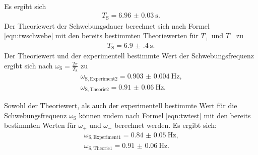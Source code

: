 \\Es ergibt sich
\begin{align*}
	T_{\mathrm{S}}=\SI{6.96(3)}{\second}\text{.}
\end{align*}
Der Theoriewert der Schwebungsdauer berechnet sich nach Formel \eqref{eqn:twschwebe} mit den bereits bestimmten Theoriewerten für $T_{\mathrm{+}}$ und $T_{\mathrm{-}}$ zu
\begin{align*}
	T_{\mathrm{S}}=\SI{6.9(4)}{\second}\text{.}
\end{align*}
Der Theoriewert und der experimentell bestimmte Wert der Schwebungsfrequenz ergibt sich nach $\omega_{\mathrm{S}}=\frac{2\pi}{T_{\mathrm{S}}}$ zu
\begin{align*}
	\omega_{\mathrm{S, Experiment2}}=\SI{0.903(4)}{\Hz}\text{,} \\
	\omega_{\mathrm{S, Theorie2}}=\SI{0.91(6)}{\Hz}\text{.}
\end{align*}

Sowohl der Theoriewert, als auch der experimentell bestimmte Wert für die Schwebungsfrequenz $\omega_{\mathrm{S}}$ können zudem nach Formel \eqref{eqn:twtest} mit den bereits bestimmten Werten für $\omega_{\mathrm{+}}$ und $\omega_{\mathrm{-}}$ berechnet werden.
Es ergibt sich:
\begin{align*}
	\omega_{\mathrm{S, Experiment1}}=\SI{0.84(5)}{\Hz}\text{,} \\
	\omega_{\mathrm{S, Theorie1}}=\SI{0.91(6)}{\Hz}\text{.}
\end{align*}






\FloatBarrier
